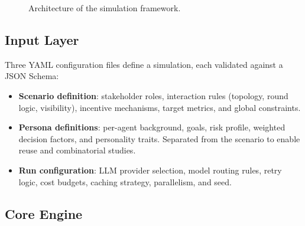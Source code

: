 \documentclass[12pt, a4paper]{article}
\begin{document}
\begin{figure}[H]
\caption{Architecture of the simulation framework.}
\label{fig:arch}
\end{figure}

\subsection*{Input Layer}

Three YAML configuration files define a simulation, each validated against a JSON Schema:
\begin{itemize}
    \item \textbf{Scenario definition}: stakeholder roles, interaction rules (topology, round logic, visibility), incentive mechanisms, target metrics, and global constraints.
    \item \textbf{Persona definitions}: per-agent background, goals, risk profile, weighted decision factors, and personality traits. Separated from the scenario to enable reuse and combinatorial studies.
    \item \textbf{Run configuration}: LLM provider selection, model routing rules, retry logic, cost budgets, caching strategy, parallelism, and seed.
\end{itemize}

\subsection*{Core Engine}
\end{document}
